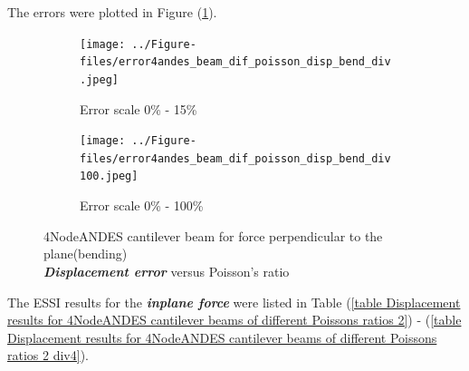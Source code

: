 \documentclass[fleqn,11pt]{article}
\begin{document}
The errors were plotted in Figure (\ref{table Displacement error 4NodeANDES cantilever beam for different Poisson ratio}).


\begin{figure}[H]
  \begin{subfigure}{0.5\textwidth}
    \centering
    \texttt{[image: ../Figure-files/error4andes\_beam\_dif\_poisson\_disp\_bend\_div.jpeg]}
    \caption{Error scale 0\% - 15\%}
  \end{subfigure}
  \begin{subfigure}{0.5\textwidth}
    \centering
    \texttt{[image: ../Figure-files/error4andes\_beam\_dif\_poisson\_disp\_bend\_div100.jpeg]}
    \caption{Error scale 0\% - 100\%}
  \end{subfigure}
  \captionsetup{justification=centering,margin=2cm}
  \caption{4NodeANDES cantilever beam for force perpendicular to the plane(bending)\\
      \emph{\textbf{Displacement error}}   versus   Poisson's ratio}
  \label{table Displacement error 4NodeANDES cantilever beam for different Poisson ratio}
\end{figure}






The ESSI results for the \textbf{\emph{inplane force}} were listed in Table (\ref{table Displacement results for 4NodeANDES cantilever beams of different Poissons ratios 2}) - (\ref{table Displacement results for 4NodeANDES cantilever beams of different Poissons ratios 2 div4}).
\end{document}
